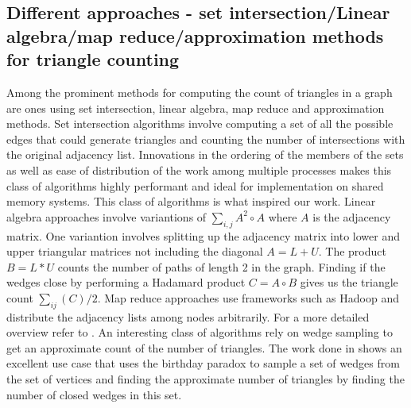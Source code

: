 \subsection{Different approaches - set intersection/Linear algebra/map reduce/approximation methods for triangle counting}
Among the prominent methods for computing the count of triangles in a graph are ones using set intersection, linear algebra, map reduce and approximation methods. Set intersection algorithms \cite{b7} involve computing a set of all the possible edges that could generate triangles and counting the number of intersections with the original adjacency list. Innovations in the ordering of the members of the sets as well as ease of distribution of the work among multiple processes makes this class of algorithms highly performant\cite{b8} and ideal for implementation on shared memory systems. This class of algorithms is what inspired our work. Linear algebra approaches involve variantions of $\sum_{i,j}A^2\circ A$ where $A$ is the adjacency matrix\cite{b6}. One variantion involves splitting up the adjacency matrix into lower and upper triangular matrices not including the diagonal $A = L + U$. The product $B = L*U$ counts the number of paths of length 2 in the graph. Finding if the wedges close by performing a Hadamard product $C= A\circ B$ gives us the triangle count $\sum_{ij}(C)/2$\cite{b10, b9}. Map reduce approaches use frameworks such as Hadoop and distribute the adjacency lists among nodes arbitrarily. For a more detailed overview refer to \cite{b11,b12}. An interesting class of algorithms rely on wedge sampling to get an approximate count of the number of triangles. The work done in \cite{b13} shows an excellent use case that uses the birthday paradox to sample a set of wedges from the set of vertices and finding the approximate number of triangles by finding the number of closed wedges in this set.

